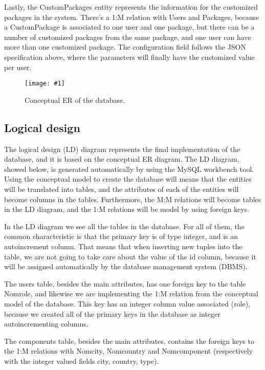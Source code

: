 \documentclass[a4paper,12pt]{book}
\newcommand{\insimg}[3]{
  \begin{figure}[H]
    \begin{center}
      \texttt{[image: \#1]}
    \end{center}
    \caption{#2}
    \label{fig:#1}
  \end{figure}
}
\begin{document}
Lastly, the CustomPackages entity represents the information for the customized packages in the system. There's a 1:M relation with Users and Packages, because a CustomPackage is associated to one user and one package, but there can be a number of customized packages from the same package, and one user can have more than one customized package. The configuration field follows the JSON specification above, where the parameters will finally have the customized value per user.

\insimg{database-design}{Conceptual ER of the database.}{0.5}

\subsection{Logical design}
The logical design (LD) diagram represents the final implementation of the database, and it is based on the conceptual ER diagram. The LD diagram, showed below, is generated automatically by using the MySQL workbench tool. Using the conceptual model to create the database will means that the entities will be translated into tables, and the attributes of each of the entities will become columns in the tables. Furthermore, the M:M relations will become tables in the LD diagram, and the 1:M relations will be model by using foreign keys.\newline

In the LD diagram we see all the tables in the database. For all of them, the common characteristic is that the primary key is of type integer, and is an autoincrement column. That means that when inserting new tuples into the table, we are not going to take care about the value of the id column, because it will be assigned automatically by the database management system (DBMS).\newline

The users table, besides the main attributes, has one foreign key to the table Nomrole, and likewise we are implementing the 1:M relation from the conceptual model of the database. This key has an integer column value associated (role), because we created all of the primary keys in the database as integer autoincrementing columns.\newline

The components table, besides the main attributes, contains the foreign keys to the 1:M relations with Nomcity, Nomcountry and Nomcomponent (respectively with the integer valued fields city, country, type).\newline
\end{document}
